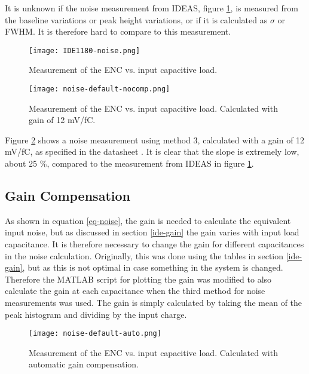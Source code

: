 \documentclass[../main/thesis.tex]{subfiles}
\begin{document}
It is unknown if the noise measurement from IDEAS, figure \ref{fig-ide-noise}, is measured from the baseline variations or peak height variations, or if it is calculated as $\sigma$ or \gls{FWHM}. It is therefore hard to compare to this measurement. 

\begin{figure}%
	\centering
	\texttt{[image: IDE1180-noise.png]}
	\caption{Measurement of the \gls{ENC} vs. input capacitive load. \citep{IDE1180}}
	\label{fig-ide-noise}
\end{figure} 

\begin{figure}%
	\centering
	\texttt{[image: noise-default-nocomp.png]}
	\caption{Measurement of the \gls{ENC} vs. input capacitive load. Calculated with gain of 12 mV/fC.}
	\label{fig-noise-nocomp}
\end{figure} 

Figure \ref{fig-noise-nocomp} shows a noise measurement using method 3, calculated with a gain of 12 mV/fC, as specified in the datasheet \citep{IDE1180}. It is clear that the slope is extremely low, about 25 \%, compared to the measurement from IDEAS in figure \ref{fig-ide-noise}. 

\subsection{Gain Compensation}
\label{ide-noise-gain}

As shown in equation \ref{eq-noise}, the gain is needed to calculate the equivalent input noise, but as discussed in section \ref{ide-gain} the gain varies with input load capacitance. It is therefore necessary to change the gain for different capacitances in the noise calculation. Originally, this was done using the tables in section \ref{ide-gain}, but as this is not optimal in case something in the system is changed. Therefore the MATLAB script for plotting the gain was modified to also calculate the gain at each capacitance when the third method for noise measurements was used. The gain is simply calculated by taking the mean of the peak histogram and dividing by the input charge. 

\begin{figure}[h!]
	\centering
	\texttt{[image: noise-default-auto.png]}
	\caption{Measurement of the \gls{ENC} vs. input capacitive load. Calculated with automatic gain compensation.}
	\label{fig-noise-auto}
\end{figure} 
\end{document}
